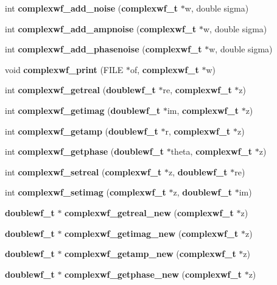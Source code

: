 \begin{CompactItemize}
\item 
int {\bf complexwf\_\-add\_\-noise} ({\bf complexwf\_\-t} $\ast$w, double sigma)
\item 
int {\bf complexwf\_\-add\_\-ampnoise} ({\bf complexwf\_\-t} $\ast$w, double sigma)
\item 
int {\bf complexwf\_\-add\_\-phasenoise} ({\bf complexwf\_\-t} $\ast$w, double sigma)
\item 
void {\bf complexwf\_\-print} (FILE $\ast$of, {\bf complexwf\_\-t} $\ast$w)
\item 
int {\bf complexwf\_\-getreal} ({\bf doublewf\_\-t} $\ast$re, {\bf complexwf\_\-t} $\ast$z)
\item 
int {\bf complexwf\_\-getimag} ({\bf doublewf\_\-t} $\ast$im, {\bf complexwf\_\-t} $\ast$z)
\item 
int {\bf complexwf\_\-getamp} ({\bf doublewf\_\-t} $\ast$r, {\bf complexwf\_\-t} $\ast$z)
\item 
int {\bf complexwf\_\-getphase} ({\bf doublewf\_\-t} $\ast$theta, {\bf complexwf\_\-t} $\ast$z)
\item 
int {\bf complexwf\_\-setreal} ({\bf complexwf\_\-t} $\ast$z, {\bf doublewf\_\-t} $\ast$re)
\item 
int {\bf complexwf\_\-setimag} ({\bf complexwf\_\-t} $\ast$z, {\bf doublewf\_\-t} $\ast$im)
\item 
{\bf doublewf\_\-t} $\ast$ {\bf complexwf\_\-getreal\_\-new} ({\bf complexwf\_\-t} $\ast$z)
\item 
{\bf doublewf\_\-t} $\ast$ {\bf complexwf\_\-getimag\_\-new} ({\bf complexwf\_\-t} $\ast$z)
\item 
{\bf doublewf\_\-t} $\ast$ {\bf complexwf\_\-getamp\_\-new} ({\bf complexwf\_\-t} $\ast$z)
\item 
{\bf doublewf\_\-t} $\ast$ {\bf complexwf\_\-getphase\_\-new} ({\bf complexwf\_\-t} $\ast$z)
\end{CompactItemize}
